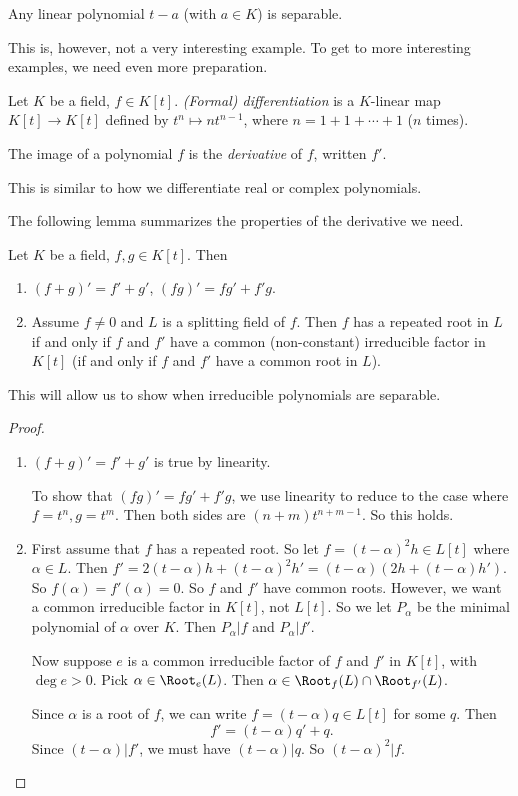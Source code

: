 \documentclass[a4paper]{article}
\begin{document}
\begin{eg}
  Any linear polynomial $t - a$ (with $a \in K$) is separable.
\end{eg}
This is, however, not a very interesting example. To get to more interesting examples, we need even more preparation.

\begin{defi}
  Let $K$ be a field, $f \in K[t]$. \emph{(Formal) differentiation} is a $K$-linear map $K[t] \to K[t]$ defined by $t^n \mapsto n t^{n - 1}$, where $n = 1 + 1 + \cdots + 1$ ($n$ times).

  The image of a polynomial $f$ is the \emph{derivative} of $f$, written $f'$.
\end{defi}
This is similar to how we differentiate real or complex polynomials.

The following lemma summarizes the properties of the derivative we need.
\begin{lemma}
  Let $K$ be a field, $f, g\in K[t]$. Then
  \begin{enumerate}
    \item $(f + g)' = f' + g'$, $(fg)' = fg' + f'g$.
    \item Assume $f \not= 0$ and $L$ is a splitting field of $f$. Then $f$ has a repeated root in $L$ if and only if $f$ and $f'$ have a common (non-constant) irreducible factor in $K[t]$ (if and only if $f$ and $f'$ have a common root in $L$).
  \end{enumerate}
\end{lemma}
This will allow us to show when irreducible polynomials are separable.

\begin{proof}\leavevmode
  \begin{enumerate}
    \item $(f + g)' = f' + g'$ is true by linearity.

      To show that $(fg)' = fg' + f'g$, we use linearity to reduce to the case where $f = t^n, g = t^m$. Then both sides are $(n + m) t^{n + m - 1}$. So this holds.
    \item First assume that $f$ has a repeated root. So let $f = (t - \alpha)^2 h \in L[t]$ where $\alpha \in L$. Then $f' = 2(t - \alpha)h + (t - \alpha)^2 h' = (t - \alpha)(2h + (t - \alpha)h')$. So $f(\alpha) = f'(\alpha) = 0$. So $f$ and $f'$ have common roots. However, we want a common irreducible factor in $K[t]$, not $L[t]$. So we let $P_\alpha$ be the minimal polynomial of $\alpha$ over $K$. Then $P_\alpha | f$ and $P_\alpha | f'$.

    Now suppose $e$ is a common irreducible factor of $f$ and $f'$ in $K[t]$, with $\deg e > 0$. Pick $\alpha \in \Root_e(L)$. Then $\alpha \in \Root_f(L) \cap \Root_{f'}(L)$.

      Since $\alpha$ is a root of $f$, we can write $f = (t - \alpha)q \in L[t]$ for some $q$. Then
      \[
        f' = (t - \alpha) q' + q.
      \]
      Since $(t - \alpha) | f'$, we must have $(t - \alpha) | q$. So $(t - \alpha)^2 | f$.
  \end{enumerate}
\end{proof}
\end{document}
